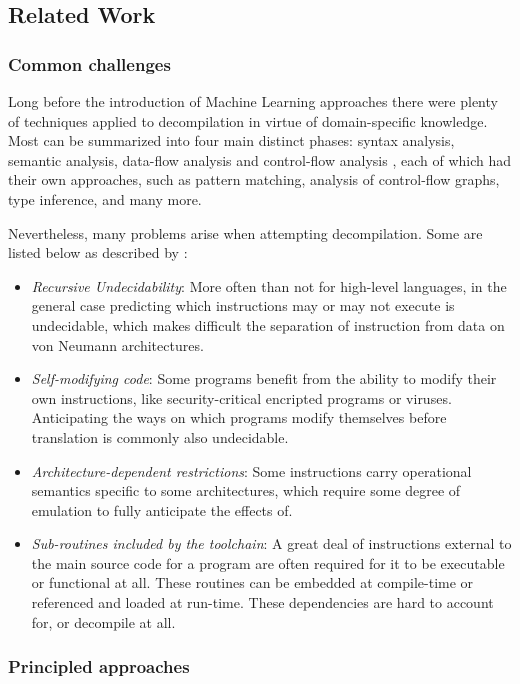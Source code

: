 \documentclass[../main.tex]{subfiles}
\begin{document}
\subsection{Related Work}

\subsubsection{Common challenges}

Long before the introduction of Machine Learning approaches there were plenty of
techniques applied to decompilation in virtue of domain-specific knowledge. Most 
can be summarized into four main distinct phases: syntax analysis, semantic analysis,
data-flow analysis and control-flow analysis \cite{cifuentes_reverse_1994}, 
each of which had their own approaches, such as pattern matching, analysis of 
control-flow graphs, type inference, and many more.

Nevertheless, many problems arise when attempting decompilation. Some are listed
below as described by \cite[p.~1-7]{cifuentes_reverse_1994}:
\begin{itemize}
    \item \textit{Recursive Undecidability}: More often than not for high-level 
    languages, in the general case predicting which instructions may or may not 
    execute is undecidable, which makes difficult the separation of instruction from
    data on von Neumann architectures. 
    \item \textit{Self-modifying code}: Some programs benefit from the ability to
    modify their own instructions, like security-critical encripted programs or
    viruses. Anticipating the ways on which programs modify themselves before translation
    is commonly also undecidable.
    \item \textit{Architecture-dependent restrictions}: Some instructions carry
    operational semantics specific to some architectures, which require some degree
    of emulation to fully anticipate the effects of.
    \item \textit{Sub-routines included by the toolchain}: A great deal of instructions
    external to the main source code for a program are often required for it to be
    executable or functional at all. These routines can be embedded at compile-time
    or referenced and loaded at run-time. These dependencies are hard to account for,
    or decompile at all.
\end{itemize}

\subsubsection{Principled approaches}
\end{document}
